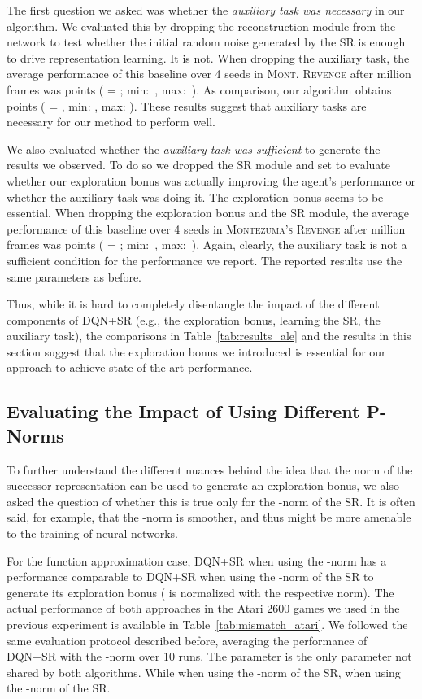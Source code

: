 \documentclass[letterpaper]{article} \usepackage{aaai20}  \usepackage{times}  \usepackage{helvet} \usepackage{courier}  \usepackage[hyphens]{url}  \usepackage{graphicx} \urlstyle{rm} \def\UrlFont{\rm}  \usepackage{graphicx}  \frenchspacing  \setlength{\pdfpagewidth}{8.5in}  \setlength{\pdfpageheight}{11in}  \usepackage{booktabs}
\begin{document}
The first question we asked was whether the \emph{auxiliary task was necessary} in our algorithm. We evaluated this by dropping the reconstruction module from the network to test whether the initial random noise generated by the SR is enough to drive representation learning. It is not. When dropping the auxiliary task, the average performance of this baseline over 4 seeds in \textsc{Mont. Revenge} after  million frames was  points ( = ; min:~, max:~). As comparison, our algorithm obtains  points ( = , min: , max: ). These results suggest that auxiliary tasks are necessary for our method to perform well.

We also evaluated whether the \emph{auxiliary task was sufficient} to generate the results we observed. To do so we dropped the SR module and set  to evaluate whether our exploration bonus was actually improving the agent's performance or whether the auxiliary task was doing it. The exploration bonus seems to be essential. When dropping the exploration bonus and the SR module, the average performance of this baseline over 4 seeds in \textsc{Montezuma's Revenge} after  million frames was  points ( = ; min:~, max:~). Again, clearly, the auxiliary task is not a sufficient condition for the performance we report. The reported results use the same parameters as before. 

Thus, while it is hard to completely disentangle the impact of the different components of DQN+SR (e.g., the exploration bonus, learning the SR, the auxiliary task), the comparisons in Table~\ref{tab:results_ale} and the results in this section suggest that the exploration bonus we introduced is essential for our approach to achieve state-of-the-art performance.

\subsection{Evaluating the Impact of Using Different P-Norms}

To further understand the different nuances behind the idea that the norm of the successor representation can be used to generate an exploration bonus, we also asked the question of whether this is true only for the -norm of the SR. It is often said, for example, that the -norm is smoother, and thus might be more amenable to the training of neural networks.

For the function approximation case, DQN+SR when using the -norm has a performance comparable to DQN+SR when using the -norm of the SR to generate its exploration bonus ( is normalized with the respective norm). The actual performance of both approaches in the Atari 2600 games we used in the previous experiment is available in  Table~\ref{tab:mismatch_atari}. We followed the same evaluation protocol described before, averaging the performance of DQN+SR with the -norm over 10 runs. The parameter  is the only parameter not shared by both algorithms. While  when using the -norm of the SR,  when using the -norm of the SR. 
\end{document}

